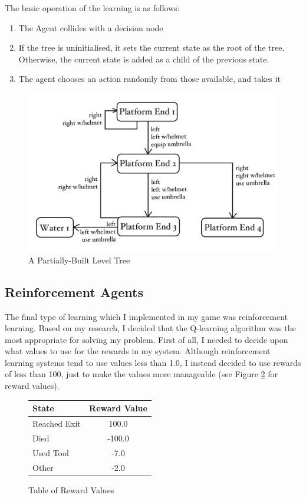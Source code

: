 \documentclass[a4paper,oneside]{report}
\begin{document}
The basic operation of the learning is as follows:

\begin{enumerate}
	\item The Agent collides with a decision node
	\item If the tree is uninitialised, it sets the current state as the root of the tree. Otherwise, the current state is added as a child of the previous state.
	\item The agent chooses an action randomly from those available, and takes it
\end{enumerate}

\begin{figure}[H]
  \centering
    \includegraphics[width=120mm]{sources/images/TreeSample}
    \caption{A Partially-Built Level Tree}
    \label{fig:TreeSample}
\end{figure}

\newpage

\subsection{Reinforcement Agents}

The final type of learning which I implemented in my game was reinforcement learning. Based on my research, I decided that the Q-learning algorithm was the most appropriate for solving my problem. First of all, I needed to decide upon what values to use for the rewards in my system. Although reinforcement learning systems tend to use values less than 1.0, I instead decided to use rewards of less than 100, just to make the values more manageable (see Figure \ref{fig:Rewards} for reward values).

\begin{figure}
\centering
\begin{tabular}{| l | c |}
  \hline
  State  & Reward Value \\
  \hline
  Reached Exit    &  100.0 \\
  Died   		  &  -100.0 \\
  Used Tool       &  -7.0 \\
  Other  		  &  -2.0 \\
  \hline
\end{tabular}
\caption{Table of Reward Values}
\label{fig:Rewards}
\end{figure}
\end{document}
